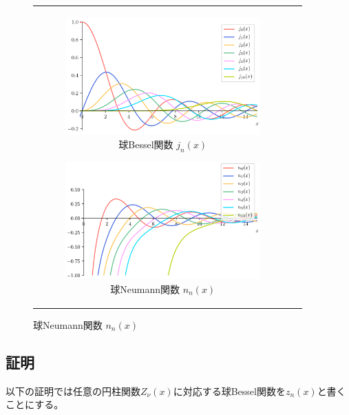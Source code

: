 \documentclass[../main/main]{subfiles}
\begin{document}
\begin{figure}[tb]
\begin{tabular}{cc}
\hspace{-24pt}
 \begin{minipage}{0.50\hsize}\small
    \begin{figure}[H]
      \centering
      \includegraphics[width=75mm]{../fig/bessel/sph_j_n.png}
      \caption{球Bessel関数 $j_n(x)$}
    \end{figure}
 \end{minipage}

 \begin{minipage}{0.50\hsize}
    \begin{figure}[H]
      \centering
      \includegraphics[width=75mm]{../fig/bessel/sph_n_n.png}
      \caption{球Neumann関数 $n_n(x)$}
    \end{figure}
 \end{minipage}
\end{tabular}
\end{figure}




\subsection*{証明}
以下の証明では任意の円柱関数$Z_\nu(x)$に対応する球Bessel関数を$z_n(x)$と書くことにする。
\end{document}
